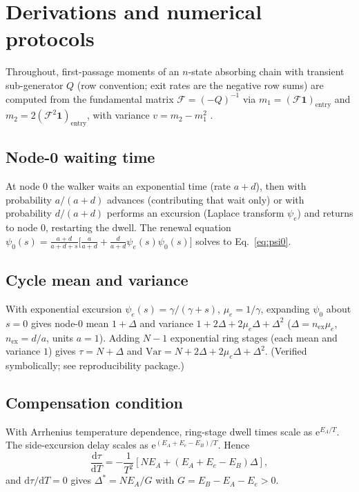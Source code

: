 \documentclass[11pt,onecolumn]{article}
\theoremstyle{definition}
\newcommand{\dd}{\mathrm{d}}
\newcommand{\ee}{\mathrm{e}}
\begin{document}
\appendix
\section{Derivations and numerical protocols}
\label{app:derivations}

Throughout, first-passage moments of an $n$-state absorbing chain with transient sub-generator $Q$ (row convention; exit rates are the negative row sums) are computed from the fundamental matrix $\mathcal{F}=(-Q)^{-1}$ via $m_1=(\mathcal{F}\mathbf 1)_{\mathrm{entry}}$ and $m_2=2(\mathcal{F}^2\mathbf 1)_{\mathrm{entry}}$, with variance $v=m_2-m_1^2$ \cite{Neuts1981,Cox1962}.

\subsection{Node-0 waiting time}
\label{app:A1}
At node $0$ the walker waits an exponential time (rate $a+d$), then with probability $a/(a+d)$ advances (contributing that wait only) or with probability $d/(a+d)$ performs an excursion (Laplace transform $\psi_e$) and returns to node $0$, restarting the dwell. The renewal equation $\psi_0(s)=\tfrac{a+d}{a+d+s}\bigl[\tfrac{a}{a+d}+\tfrac{d}{a+d}\psi_e(s)\psi_0(s)\bigr]$ solves to Eq.~\eqref{eq:psi0}.

\subsection{Cycle mean and variance}
\label{app:A2}
With exponential excursion $\psi_e(s)=\gamma/(\gamma+s)$, $\mu_e=1/\gamma$, expanding $\psi_0$ about $s=0$ gives node-0 mean $1+\Delta$ and variance $1+2\Delta+2\mu_e\Delta+\Delta^2$ ($\Delta=n_{\mathrm{ex}}\mu_e$, $n_{\mathrm{ex}}=d/a$, units $a=1$). Adding $N-1$ exponential ring stages (each mean and variance $1$) gives $\tau=N+\Delta$ and $\mathrm{Var}=N+2\Delta+2\mu_e\Delta+\Delta^2$. (Verified symbolically; see reproducibility package.)

\subsection{Compensation condition}
\label{app:A3}
With Arrhenius temperature dependence, ring-stage dwell times scale as $\ee^{E_A/T}$. The side-excursion delay scales as $\ee^{(E_A+E_e-E_B)/T}$. Hence
\begin{equation}
\frac{\dd\tau}{\dd T}=-\frac{1}{T^2}
\left[N E_A+(E_A+E_e-E_B)\Delta\right],
\end{equation}
and $\dd\tau/\dd T=0$ gives $\Delta^\ast=NE_A/G$ with $G=E_B-E_A-E_e>0$.
\end{document}
